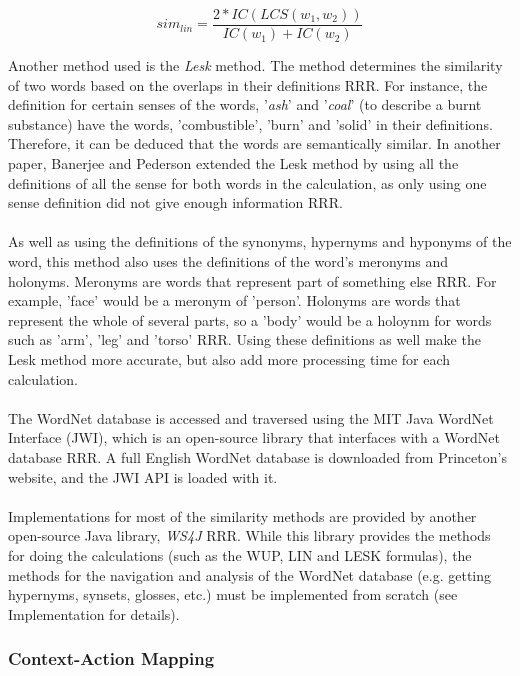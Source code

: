 \documentclass[11pt]{article}
\begin{document}
$$sim_{lin} = \frac{2*IC(LCS(w_1,w_2))}{IC(w_1)+IC(w_2)}$$

Another method used is the \textit{Lesk} method. The method determines the similarity of two words based on the overlaps in their definitions RRR. For instance, the definition for certain senses of the words, '\textit{ash}' and '\textit{coal}' (to describe a burnt substance) have the words, 'combustible', 'burn' and 'solid' in their definitions. Therefore, it can be deduced that the words are semantically similar. In another paper, Banerjee and Pederson extended the Lesk method by using all the definitions of all the sense for both words in the calculation, as only using one sense definition did not give enough information RRR.
\\
\\
As well as using the definitions of the synonyms, hypernyms and hyponyms of the word, this method also uses the definitions of the word's meronyms and holonyms. Meronyms are words that represent part of something else RRR. For example, 'face' would be a meronym of 'person'. Holonyms are words that represent the whole of several parts, so a 'body' would be a holoynm for words such as 'arm', 'leg' and 'torso' RRR. Using these definitions as well make the Lesk method more accurate, but also add more processing time for each calculation.
\\
\\
The WordNet database is accessed and traversed using the MIT Java WordNet Interface (JWI), which is an open-source library that interfaces with a WordNet database RRR. A full English WordNet database is downloaded from Princeton's website, and the JWI API is loaded with it.
\\
\\
Implementations for most of the similarity methods are provided by another open-source Java library, \textit{WS4J} RRR. While this library provides the methods for doing the calculations (such as the WUP, LIN and LESK formulas), the methods for the navigation and analysis of the WordNet database (e.g. getting hypernyms, synsets, glosses, etc.) must be implemented from scratch (see Implementation for details).

\subsubsection{Context-Action Mapping}
\end{document}
